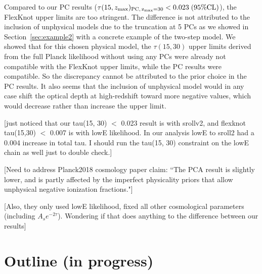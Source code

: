 \documentclass[prd,twocolumn,amsmath,amssymb,floatfix,superscriptaddress,nofootinbib]{revtex4-1}
\newcommand{\zmax}{z_{\rm max}}
\begin{document}
{{Compared to our PC results ($\tau(15, \zmax)_{\rm PC,\, \zmax=30} < 0.023 \; (95\% \mathrm{CL})$), the FlexKnot upper limits are too stringent. The difference is not attributed to the inclusion of unphysical models due to the truncation at 5 PCs as we showed in Section~\ref{sec:example2} with a concrete example of the two-step model. We showed that for this chosen physical model, the $\tau(15, 30)$ upper limits derived from the full Planck likelihood without using any PCs were already not compatible with the FlexKnot upper limits, while the PC results were compatible. So the discrepancy cannot be attributed to the prior choice in the PC results. It also seems that the inclusion of unphysical model would in any case shift the optical depth at high-redshift toward more negative values, which would decrease rather than increase the upper limit. 

[just noticed that our tau(15, 30) $<$ 0.023 result is with srollv2, and flexknot tau(15,30) $<$ 0.007 is with lowE likelihood. In our analysis lowE to sroll2 had a 0.004 increase in total tau. I should run the tau(15, 30) constraint on the lowE chain as well just to double check.]

[Need to address Planck2018 cosmology paper claim: ``The PCA result is slightly lower, and is partly affected by the imperfect physicality priors that allow unphysical negative ionization fractions."]

[Also, they only used lowE likelihood, fixed all other cosmological parameters (including $A_s e^{-2\tau}$). Wondering if that does anything to the difference between our results]



\section{Outline (in progress)}

}}
\end{document}
